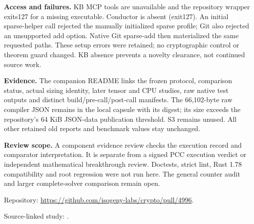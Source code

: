 \documentclass[10pt]{article}
\begin{document}
\textbf{Access and failures.} KB MCP tools are unavailable and the repository
wrapper exits127 for a missing executable. Conductor is absent (exit127).
An initial sparse-helper call rejected the manually initialized sparse profile;
Git also rejected an unsupported add option. Native Git sparse-add then
materialized the same requested paths. These setup errors were retained; no
cryptographic control or theorem guard changed. KB absence prevents a novelty
clearance, not continued source work.

\textbf{Evidence.} The companion README links the frozen protocol, comparison
status, actual sizing identity, later tensor and CPU studies, raw native test
outputs and distinct build/pre-call/post-call manifests. The 66,102-byte raw
compiler JSON remains in the local capsule with its digest; its size exceeds
the repository's 64 KiB JSON-data publication threshold. S3 remains unused.
All other retained old reports and benchmark values stay unchanged.

\textbf{Review scope.} A component evidence review checks the execution record
and comparator interpretation. It is separate from a signed PCC execution
verdict or independent mathematical breakthrough review. Doctests, strict lint,
Rust 1.78 compatibility and root regression were not run here. The general counter
audit and larger complete-solver comparison remain open.

\small Repository: \url{https://github.com/isogeny-labs/crypto/pull/4996}.

Source-linked study: .
\end{document}
